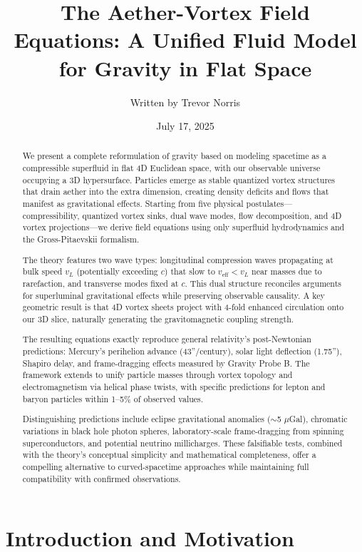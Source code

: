 \documentclass{article}
\title{The Aether-Vortex Field Equations: A Unified Fluid Model for Gravity in Flat Space}
\author{Written by Trevor Norris}
\date{July 17, 2025}
\begin{document}
\maketitle

\begin{abstract}
We present a complete reformulation of gravity based on modeling spacetime as a compressible superfluid in flat 4D Euclidean space, with our observable universe occupying a 3D hypersurface. Particles emerge as stable quantized vortex structures that drain aether into the extra dimension, creating density deficits and flows that manifest as gravitational effects. Starting from five physical postulates---compressibility, quantized vortex sinks, dual wave modes, flow decomposition, and 4D vortex projections---we derive field equations using only superfluid hydrodynamics and the Gross-Pitaevskii formalism.

The theory features two wave types: longitudinal compression waves propagating at bulk speed $v_L$ (potentially exceeding $c$) that slow to $v_{\text{eff}} < v_L$ near masses due to rarefaction, and transverse modes fixed at $c$. This dual structure reconciles arguments for superluminal gravitational effects while preserving observable causality. A key geometric result is that 4D vortex sheets project with 4-fold enhanced circulation onto our 3D slice, naturally generating the gravitomagnetic coupling strength.

The resulting equations exactly reproduce general relativity's post-Newtonian predictions: Mercury's perihelion advance (43''/century), solar light deflection (1.75''), Shapiro delay, and frame-dragging effects measured by Gravity Probe B. The framework extends to unify particle masses through vortex topology and electromagnetism via helical phase twists, with specific predictions for lepton and baryon particles within 1--5\% of observed values.

Distinguishing predictions include eclipse gravitational anomalies ($\sim$5 $\mu$Gal), chromatic variations in black hole photon spheres, laboratory-scale frame-dragging from spinning superconductors, and potential neutrino millicharges. These falsifiable tests, combined with the theory's conceptual simplicity and mathematical completeness, offer a compelling alternative to curved-spacetime approaches while maintaining full compatibility with confirmed observations.
\end{abstract}

\section{Introduction and Motivation}
\end{document}
